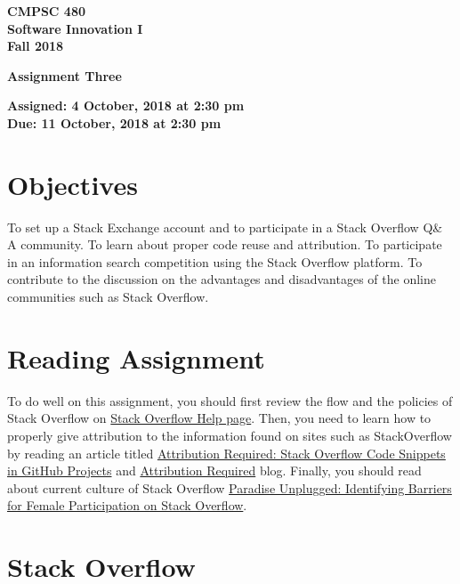 \documentclass[11pt]{article}
\newcommand{\assignmentduedate}{11 October}
\newcommand{\assignmentassignedate}{ 4 October}
\newcommand{\assignmentnumber}{Three}
\newcommand{\labyear}{2018}
\newcommand{\labtime}{2:30 pm}
\newcommand{\assigneddate}{Assigned:  \assignmentassignedate, \labyear{} at \labtime{}}
\newcommand{\duedate}{Due:  \assignmentduedate, \labyear{} at \labtime{}}
\newcommand{\labtitle}[1]
{
  \begin{center}
    \begin{center}
      \bf
      CMPSC 480 \\ Software Innovation I\\
      Fall 2018\\
      \medskip
    \end{center}
    \bf
    #1
  \end{center}
}
\begin{document}
\thispagestyle{empty}

\labtitle{Assignment \assignmentnumber{} }
\begin{center} \textbf{ \assigneddate{} \\ \duedate{} } \end{center} 
\noindent \textbf{ }

\section*{Objectives}

To set up a Stack Exchange account and to participate in a Stack Overflow Q\& A community. To learn about proper code reuse and attribution. To participate in an information search competition using the Stack Overflow platform. To contribute to the discussion on the advantages and disadvantages of the online communities such as Stack Overflow.

\section*{Reading Assignment}

To do well on this assignment, you
should first review the flow and the policies of Stack Overflow on \href{https://stackoverflow.com/help}{Stack Overflow Help page}.
Then, you need to learn how to properly give attribution to the information found on sites such as StackOverflow by reading an article titled \href{
https://ieeexplore.ieee.org/document/7965289/}{Attribution Required: Stack Overflow Code Snippets in GitHub Projects} and \href{
https://stackoverflow.blog/2009/06/25/attribution-required}{Attribution Required} blog. Finally, you should read about current culture of Stack Overflow \href{http://www.pgbovine.net/publications/stackoverflow-female-participation_FSE-2016.pdf}{Paradise Unplugged: Identifying Barriers for Female
Participation on Stack Overflow}.

\section*{Stack Overflow}
\end{document}
